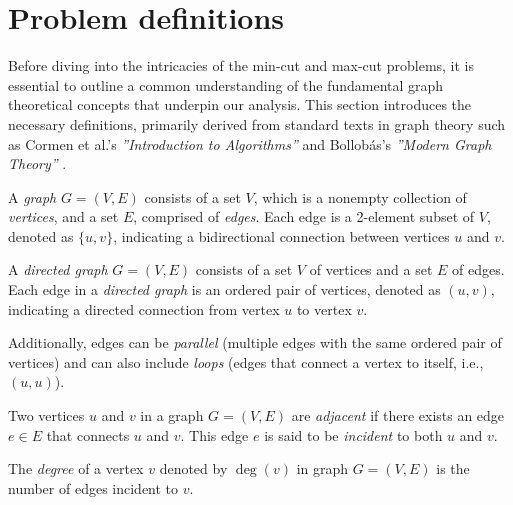 \section{Problem definitions}

Before diving into the intricacies of the min-cut and max-cut problems, it is essential to outline a common understanding of the fundamental graph theoretical concepts that underpin our analysis. This section introduces the necessary definitions, primarily derived from standard texts in graph theory such as Cormen et al.'s \emph{''Introduction to Algorithms''} \cite{cormen2022introduction} and Bollobás's \emph{''Modern Graph Theory''} \cite{bollobas1998modern}.

\begin{definition}
    \label{def:graph}
    A \emph{graph} \( G = (V, E) \) consists of a set \( V \), which is a nonempty collection of \emph{vertices}, and a set \( E \), comprised of \emph{edges}. Each edge is a 2-element subset of \( V \), denoted as \(\{u, v\}\), indicating a bidirectional connection between vertices \( u \) and \( v \).
\end{definition}

\begin{definition}
    \label{def:directedGraph}
    A \emph{directed graph} \( G = (V, E) \) consists of a set \( V \) of vertices and a set \( E \) of edges. Each edge in a \emph{directed graph} is an ordered pair of vertices, denoted as \((u, v)\), indicating a directed connection from vertex \( u \) to vertex \( v \). 
\end{definition}

\noindent
Additionally, edges can be \emph{parallel} (multiple edges with the same ordered pair of vertices) and can also include \emph{loops} (edges that connect a vertex to itself, i.e., \((u, u)\)).


\begin{definition}[adjacency]
    \label{def:adjacency}
    Two vertices \( u \) and \( v \) in a graph \( G = (V, E) \) are \emph{adjacent} if there exists an edge \( e \in E \) that connects \( u \) and \( v \). This edge \( e \) is said to be \emph{incident} to both \( u \) and \( v \).
\end{definition}

\begin{definition}[degree]
    \label{def:degree}
    The \emph{degree} of a vertex \( v \) denoted by \( \deg(v) \) in graph \( G = (V, E) \) is the number of edges incident to \( v \).
\end{definition}

